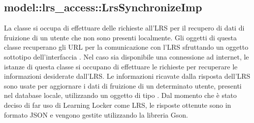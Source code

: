 \documentclass[../Tesi.tex]{subfiles}
\begin{document}
		\subsection{model::lrs\_access::LrsSynchronizeImp}
		La classe  si occupa di effettuare delle richieste all'LRS per 
		il recupero di dati di fruizione di un utente che non sono presenti localmente. Gli oggetti di questa classe recuperano gli URL per la comunicazione con l'LRS sfruttando un oggetto sottotipo dell'interfaccia . Nel caso sia disponibile una connessione ad internet, le istanze di questa classe si occupano di effettuare le richieste per recuperare le informazioni desiderate dall'LRS. Le informazioni ricavate dalla risposta dell'LRS sono usate per aggiornare i dati di fruizione di un determinato utente, presenti nel database locale, utilizzando un oggetto di tipo . Dal momento che è stato deciso di far uso di Learning Locker come LRS, le risposte ottenute sono in formato JSON e vengono gestite utilizzando la libreria Gson.
\end{document}
